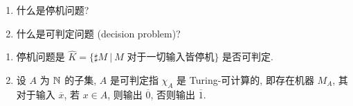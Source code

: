 \begin{problem}
\begin{enumerate}
\item 什么是停机问题?
\item 什么是可判定问题 (decision problem)?
\end{enumerate}
\end{problem}

\begin{solution}
\begin{enumerate}
\item 停机问题是 $\hat{K} = \{ \sharp M ~ | ~ M \text{ 对于一切输入皆停机} \}$ 是否可判定.
\item 设 $A$ 为 $\mathbb{N}^{}$ 的子集, $A$ 是可判定指 $\chi_A$ 是 Turing-可计算的, 即存在机器 $M_A$, 其对于输入 $\overline{x}$, 若 $x \in A$, 则输出 $\overline{0}$, 否则输出 $\overline{1}$.
\end{enumerate}
\end{solution}

